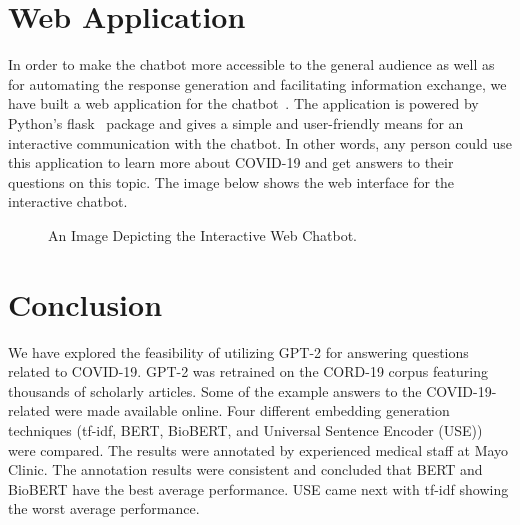\documentclass[sigconf,natbib=false]{acmart}
\begin{document}

\section{Web Application}

In order to make the chatbot more accessible to the general audience as well as
for automating the response generation and facilitating information exchange,
we have built a web application for the chatbot~\cite{web-app}. The application
is powered by Python's flask~\cite{flask} package and gives a simple and
user-friendly means for an interactive communication with the chatbot. In other
words, any person could use this application to learn more about COVID-19 and
get answers to their questions on this topic. The image below shows the web
interface for the interactive chatbot.

\begin{figure}[H]
  \centering
  \caption{An Image Depicting the Interactive Web Chatbot.}
\end{figure}



\section{Conclusion}

We have explored the feasibility of utilizing GPT-2 for answering questions
related to COVID-19. GPT-2 was retrained on the CORD-19 corpus featuring
thousands of scholarly articles. Some of the example answers to the
COVID-19-related were made available online. Four different embedding
generation techniques (tf-idf, BERT, BioBERT, and Universal Sentence Encoder
(USE)) were compared.  The results were annotated by experienced medical staff
at Mayo Clinic. The annotation results were consistent and concluded that BERT
and BioBERT have the best average performance. USE came next with tf-idf
showing the worst average performance.


\printbibliography%
\end{document}
